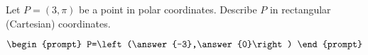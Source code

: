 \documentclass{ximera}
\author{Gregory Hartman \and Matthew Carr}
\begin{document}
\begin{exercise}





Let $P=(3,\pi)$ be a point in polar coordinates. Describe $P$ in rectangular (Cartesian) coordinates.

\[
\begin{prompt}
P=\left(\answer{-3},\answer{0}\right)
\end{prompt}
\]

\end{exercise}
\end{document}
